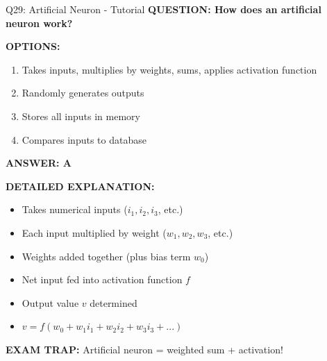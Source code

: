 \documentclass[8pt]{beamer}
\begin{document}
	\begin{frame}{Q29: Artificial Neuron - Tutorial}
		\fontsize{6.5}{7.5}\selectfont
		\textbf{QUESTION: How does an artificial neuron work?}
		
		\vspace{0.1cm}
		\textbf{OPTIONS:}
		\begin{enumerate}
			\item Takes inputs, multiplies by weights, sums, applies activation function
			\item Randomly generates outputs
			\item Stores all inputs in memory
			\item Compares inputs to database
		\end{enumerate}
		
		\vspace{0.1cm}
		\textcolor{myblue}{\textbf{ANSWER: A}}
		
		\vspace{0.1cm}
		\textbf{DETAILED EXPLANATION:}
		\begin{itemize}
			\item Takes numerical inputs ($i_1, i_2, i_3$, etc.)
			\item Each input multiplied by weight ($w_1, w_2, w_3$, etc.)
			\item Weights added together (plus bias term $w_0$)
			\item Net input fed into activation function $f$
			\item Output value $v$ determined
			\item $v = f(w_0 + w_1 i_1 + w_2 i_2 + w_3 i_3 + ...)$
		\end{itemize}
		
		\vspace{0.1cm}
		\textcolor{myred}{\textbf{EXAM TRAP:}} Artificial neuron = \textcolor{myblue}{weighted sum + activation}!
	\end{frame}
	
\end{document}
